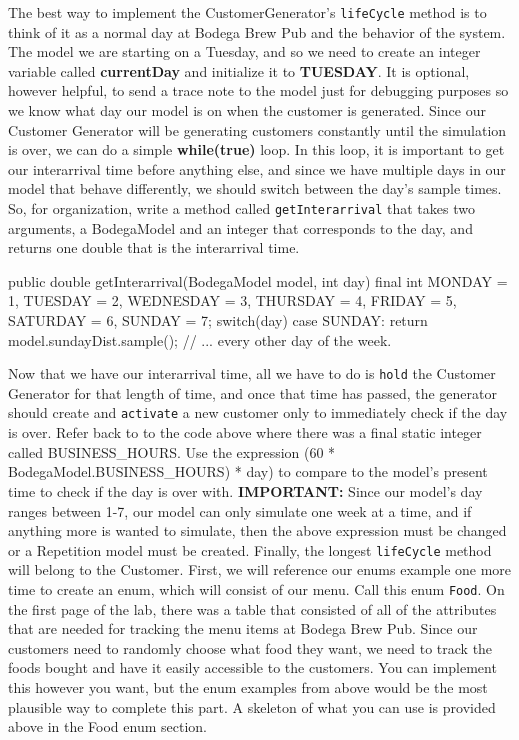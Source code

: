 \documentclass[11pt]{article}
\newcommand{\class}[1]{\texttt{#1}}
\newcommand{\method}[1]{\texttt{#1}}
\begin{document}
\newline
The best way to implement the CustomerGenerator's \method{lifeCycle} method is to think of it as a normal day at Bodega Brew Pub and the behavior of the system. The model we are starting on a Tuesday, and so we need to create an integer variable called \textbf{currentDay} and initialize it to \textbf{TUESDAY}. It is optional, however helpful, to send a trace note to the model just for debugging purposes so we know what day our model is on when the customer is generated.
\newline
Since our Customer Generator will be generating customers constantly until the simulation is over, we can do a simple \textbf{while(true)} loop. In this loop, it is important to get our interarrival time before anything else, and since we have multiple days in our model that behave differently, we should switch between the day's sample times. So, for organization, write a method called \method{getInterarrival} that takes two arguments, a BodegaModel and an integer that corresponds to the day, and returns one double that is the interarrival time.
\begin{java}
public double getInterarrival(BodegaModel model, int day)
{
	final int MONDAY = 1, TUESDAY = 2, WEDNESDAY = 3, THURSDAY = 4, FRIDAY = 5, SATURDAY = 6, SUNDAY = 7;
	switch(day)
	{
		case SUNDAY:
			return model.sundayDist.sample();
		// ... every other day of the week.
	}
}
\end{java}
Now that we have our interarrival time, all we have to do is \method{hold} the Customer Generator for that length of time, and once that time has passed, the generator should create and \method{activate} a new customer only to immediately check if the day is over. Refer back to to the code above where there was a final static integer called BUSINESS\_HOURS. Use the expression (60 * BodegaModel.BUSINESS\_HOURS) * day) to compare to the model's present time to check if the day is over with.
\newline
\textbf{IMPORTANT:} Since our model's day ranges between 1-7, our model can only simulate one week at a time, and if anything more is wanted to simulate, then the above expression must be changed or a Repetition model must be created.
\newline
Finally, the longest \method{lifeCycle} method will belong to the Customer. First, we will reference our enums example one more time to create an enum, which will consist of our menu. Call this enum \class{Food}. On the first page of the lab, there was a table that consisted of all of the attributes that are needed for tracking the menu items at Bodega Brew Pub. Since our customers need to randomly choose what food they want, we need to track the foods bought and have it easily accessible to the customers. You can implement this however you want, but the enum examples from above would be the most plausible way to complete this part. A skeleton of what you can use is provided above in the Food enum section.
\end{document}
